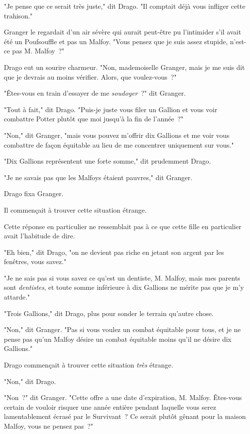"Je pense que ce serait très juste," dit Drago. "Il comptait déjà vous infliger cette trahison."

Granger le regardait d'un air sévère qui aurait peut-être pu l'intimider s'il avait été un Poufsouffle et pas un Malfoy. "Vous pensez que je suis assez stupide, n'est-ce pas M. Malfoy~?"

Drago eut un sourire charmeur. "Non, mademoiselle Granger, mais je me suis dit que je devrais au moins vérifier. Alors, que voulez-vous~?"

"Êtes-vous en train d'essayer de me \emph{soudoyer}~?" dit Granger.

"Tout à fait," dit Drago. "Puis-je juste vous filer un Gallion et vous voir combattre Potter plutôt que moi jusqu'à la fin de l'année~?"

"Non," dit Granger, "mais vous pouvez m'offrir dix Gallions et me voir vous combattre de façon équitable au lieu de me concentrer uniquement sur vous."

"Dix Gallions représentent une forte somme," dit prudemment Drago.

"Je ne savais pas que les Malfoys étaient pauvres," dit Granger.

Drago fixa Granger.

Il commençait à trouver cette situation étrange.

Cette réponse en particulier ne ressemblait pas à ce que cette fille en particulier avait l'habitude de dire.

"Eh bien," dit Drago, "on ne devient pas riche en jetant son argent par les fenêtres, vous savez."

"Je ne sais pas si vous savez ce qu'est un dentiste, M. Malfoy, mais mes parents sont \emph{dentistes}, et toute somme inférieure à dix Gallions ne mérite pas que je m'y attarde."

"Trois Gallions," dit Drago, plus pour sonder le terrain qu'autre chose.

"Non," dit Granger. "Pas si vous voulez un combat équitable pour tous, et je ne pense pas qu'un Malfoy désire un combat équitable moins qu'il ne désire dix Gallions."

Drago commençait à trouver cette situation \emph{très} étrange.

"Non," dit Drago.

"Non~?" dit Granger. "Cette offre a une date d'expiration, M. Malfoy. Êtes-vous certain de vouloir risquer une année entière pendant laquelle vous serez lamentablement écrasé par le Survivant~? Ce serait plutôt gênant pour la maison Malfoy, vous ne pensez pas~?"

